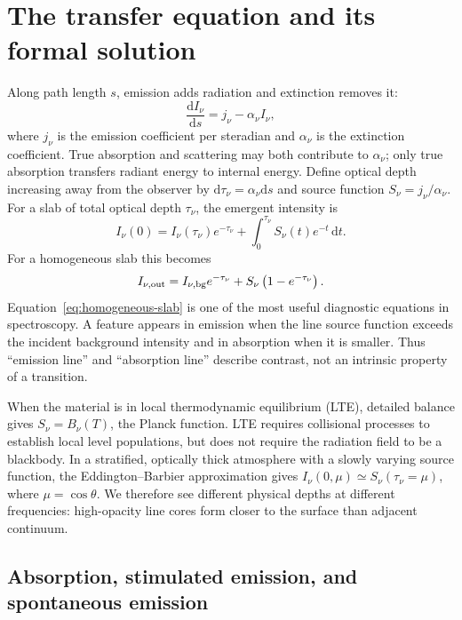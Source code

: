 \section{The transfer equation and its formal solution}

Along path length $s$, emission adds radiation and extinction removes it:
\begin{equation}
 \frac{\mathrm{d}I_\nu}{\mathrm{d}s}=j_\nu-\alpha_\nu I_\nu,
 \label{eq:transfer-dimensional}
\end{equation}
where $j_\nu$ is the emission coefficient per steradian and $\alpha_\nu$ is the
extinction coefficient.  True absorption and scattering may both contribute to
$\alpha_\nu$; only true absorption transfers radiant energy to internal energy.
Define optical depth increasing away from the observer by
$\mathrm{d}\tau_\nu=\alpha_\nu\mathrm{d}s$ and source function
$S_\nu=j_\nu/\alpha_\nu$.  For a slab of total optical depth $\tau_\nu$, the
emergent intensity is
\begin{equation}
 I_\nu(0)=I_\nu(\tau_\nu)e^{-\tau_\nu}
 +\int_0^{\tau_\nu} S_\nu(t)e^{-t}\,\mathrm{d}t .
 \label{eq:formal-solution}
\end{equation}
For a homogeneous slab this becomes
\begin{equation}
 I_{\nu,\rm out}=I_{\nu,\rm bg}e^{-\tau_\nu}
                 +S_\nu\left(1-e^{-\tau_\nu}\right).
 \label{eq:homogeneous-slab}
\end{equation}
Equation~\eqref{eq:homogeneous-slab} is one of the most useful diagnostic equations
in spectroscopy.  A feature appears in emission when the line source function
exceeds the incident background intensity and in absorption when it is smaller.
Thus ``emission line'' and ``absorption line'' describe contrast, not an intrinsic
property of a transition.

When the material is in local thermodynamic equilibrium (LTE), detailed balance
gives $S_\nu=B_\nu(T)$, the Planck function.  LTE requires collisional processes to
establish local level populations, but does not require the radiation field to be a
blackbody.  In a stratified, optically thick atmosphere with a slowly varying source
function, the Eddington--Barbier approximation gives
$I_\nu(0,\mu)\simeq S_\nu(\tau_\nu=\mu)$, where
$\mu=\cos\theta$.  We therefore see different physical depths at different
frequencies: high-opacity line cores form closer to the surface than adjacent
continuum.

\subsection{Absorption, stimulated emission, and spontaneous emission}

